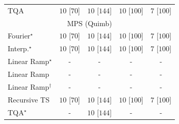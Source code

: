 \begin{tabular}{l|cccc|}
TQA & {\cellcolor[HTML]{00441B}} \color[HTML]{F1F1F1} $10$ [$70$] & {\cellcolor[HTML]{00441B}} \color[HTML]{F1F1F1} $10$ [$144$] & {\cellcolor[HTML]{00441B}} \color[HTML]{F1F1F1} $10$ [$100$] & {\cellcolor[HTML]{37A055}} \color[HTML]{F1F1F1} $7$ [$100$] \\
\cline{1-5}
\multicolumn{5}{c}{\rule{0pt}{8pt}MPS (Quimb)} \\
\midrule
Fourier$^\star$ & {\cellcolor[HTML]{00441B}} \color[HTML]{F1F1F1} $10$ [$70$] & {\cellcolor[HTML]{00441B}} \color[HTML]{F1F1F1} $10$ [$144$] & {\cellcolor[HTML]{00441B}} \color[HTML]{F1F1F1} $10$ [$100$] & {\cellcolor[HTML]{37A055}} \color[HTML]{F1F1F1} $7$ [$100$] \\
Interp.$^\star$ & {\cellcolor[HTML]{00441B}} \color[HTML]{F1F1F1} $10$ [$70$] & {\cellcolor[HTML]{00441B}} \color[HTML]{F1F1F1} $10$ [$144$] & {\cellcolor[HTML]{00441B}} \color[HTML]{F1F1F1} $10$ [$100$] & {\cellcolor[HTML]{37A055}} \color[HTML]{F1F1F1} $7$ [$100$] \\
Linear Ramp$^\star$ & {\cellcolor[HTML]{000000}} \color[HTML]{F1F1F1} {\cellcolor{white}} \color{black} - & {\cellcolor[HTML]{000000}} \color[HTML]{F1F1F1} {\cellcolor{white}} \color{black} - & {\cellcolor[HTML]{000000}} \color[HTML]{F1F1F1} {\cellcolor{white}} \color{black} - & {\cellcolor[HTML]{000000}} \color[HTML]{F1F1F1} {\cellcolor{white}} \color{black} - \\
Linear Ramp & {\cellcolor[HTML]{000000}} \color[HTML]{F1F1F1} {\cellcolor{white}} \color{black} - & {\cellcolor[HTML]{000000}} \color[HTML]{F1F1F1} {\cellcolor{white}} \color{black} - & {\cellcolor[HTML]{000000}} \color[HTML]{F1F1F1} {\cellcolor{white}} \color{black} - & {\cellcolor[HTML]{000000}} \color[HTML]{F1F1F1} {\cellcolor{white}} \color{black} - \\
Linear Ramp$^\dagger$ & {\cellcolor[HTML]{000000}} \color[HTML]{F1F1F1} {\cellcolor{white}} \color{black} - & {\cellcolor[HTML]{000000}} \color[HTML]{F1F1F1} {\cellcolor{white}} \color{black} - & {\cellcolor[HTML]{000000}} \color[HTML]{F1F1F1} {\cellcolor{white}} \color{black} - & {\cellcolor[HTML]{000000}} \color[HTML]{F1F1F1} {\cellcolor{white}} \color{black} - \\
Recursive TS & {\cellcolor[HTML]{00441B}} \color[HTML]{F1F1F1} $10$ [$70$] & {\cellcolor[HTML]{00441B}} \color[HTML]{F1F1F1} $10$ [$144$] & {\cellcolor[HTML]{00441B}} \color[HTML]{F1F1F1} $10$ [$100$] & {\cellcolor[HTML]{37A055}} \color[HTML]{F1F1F1} $7$ [$100$] \\
TQA$^\star$ & {\cellcolor[HTML]{000000}} \color[HTML]{F1F1F1} {\cellcolor{white}} \color{black} - & {\cellcolor[HTML]{00441B}} \color[HTML]{F1F1F1} $10$ [$144$] & {\cellcolor[HTML]{000000}} \color[HTML]{F1F1F1} {\cellcolor{white}} \color{black} - & {\cellcolor[HTML]{000000}} \color[HTML]{F1F1F1} {\cellcolor{white}} \color{black} - \\

\end{tabular}
